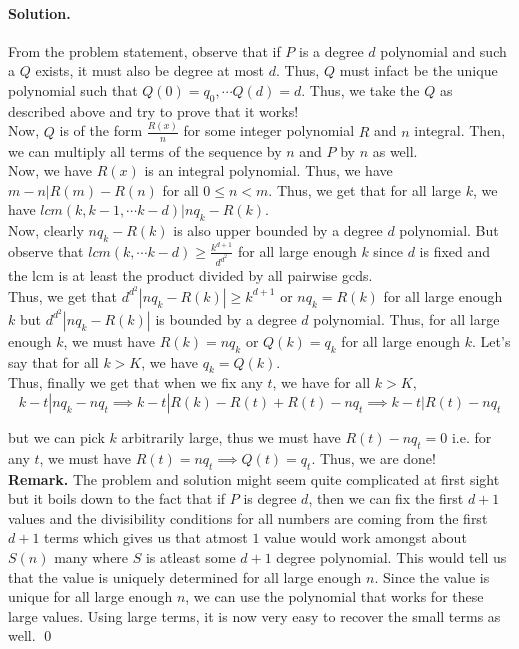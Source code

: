 \documentclass[12pt]{article}
\newenvironment{solution}
{\paragraph{Solution.}}
{\qed\eject}
\begin{document}
\begin{solution}
    From the problem statement, observe that if $P$ is a degree $d$ polynomial and such a $Q$ exists, it must also be degree at most $d$. Thus, $Q$ must infact be the unique polynomial such that $Q(0)=q_0, \cdots Q(d)=d$. Thus, we take the $Q$ as described above and try to prove that it works!\\

    Now, $Q$ is of the form $\frac{R(x)}{n}$ for some integer polynomial $R$ and $n$ integral. Then, we can multiply all terms of the sequence by $n$ and $P$ by $n$ as well.\\
    
    Now, we have $R(x)$ is an integral polynomial. Thus, we have $m-n|R(m)-R(n)$ for all $0\le n<m$. Thus, we get that for all large $k$, we have $lcm(k, k-1, \cdots k-d)|nq_k-R(k)$.\\
    
    Now, clearly $nq_k-R(k)$ is also upper bounded by a degree $d$ polynomial. But observe that $lcm(k,\cdots k-d)\ge \frac{k^{d+1}}{d^{d^2}}$ for all large enough $k$ since $d$ is fixed and the lcm is at least the product divided by all pairwise gcds.\\

    Thus, we get that $d^{d^2}|nq_k-R(k)|\ge k^{d+1}$ or $nq_k=R(k)$ for all large enough $k$ but $d^{d^2}|nq_k-R(k)|$ is bounded by a degree $d$ polynomial. Thus, for all large enough $k$, we must have $R(k)=nq_k$ or $Q(k)=q_k$ for all large enough $k$. Let's say that for all $k>K$, we have $q_k=Q(k)$.\\

    Thus, finally we get that when we fix any $t$, we have for all $k>K$, \[k-t|nq_k-nq_t\implies k-t|R(k)-R(t)+R(t)-nq_t\implies k-t|R(t)-nq_t\]

    but we can pick $k$ arbitrarily large, thus we must have $R(t)-nq_t=0$ i.e. for any $t$, we must have $R(t)=nq_t\implies Q(t)=q_t$. Thus, we are done!\\

    \textbf{Remark.} The problem and solution might seem quite complicated at first sight but it boils down to the fact that if $P$ is degree $d$, then we can fix the first $d+1$ values and the divisibility conditions for all numbers are coming from the first $d+1$ terms which gives us that atmost $1$ value would work amongst about $S(n)$ many where $S$ is atleast some $d+1$ degree polynomial. This would tell us that the value is uniquely determined for all large enough $n$. Since the value is unique for all large enough $n$, we can use the polynomial that works for these large values. Using large terms, it is now very easy to recover the small terms as well.
\end{solution}
\end{document}
